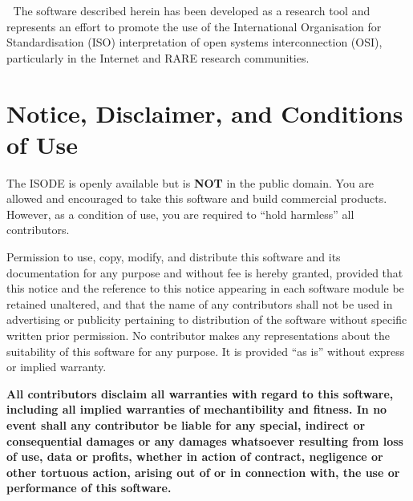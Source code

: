 
\preface
The software described herein has been developed as a research tool and
represents an effort to promote the use of the International 
Organisation for Standardisation (ISO) interpretation of open systems interconnection (OSI),
particularly in the Internet and RARE research communities.

\newpage\section*	{Notice, Disclaimer, and Conditions of Use}\label{license}
The ISODE is openly available but is {\bf NOT\/} in the public domain.
You are allowed and encouraged to take this software and build commercial
products.
However, as a condition of use, you are required to ``hold harmless'' all
contributors.

\noindent
Permission to use, copy, modify, and distribute this software and its
documentation for any purpose and without fee is hereby granted, provided
that this notice and the reference to this notice
appearing in each software module be retained unaltered, 
and that the name of any contributors shall not be used in advertising
or publicity pertaining to distribution of the software without specific
written prior permission.
No contributor makes any
representations about the suitability of this software for any purpose.
It is provided ``as is'' without express or implied warranty.

\vskip 0.15in
\noindent
\begin{small}
{\bf All contributors disclaim all warranties with regard to this
software, including all implied warranties of me\-chan\-ti\-bil\-ity
and fitness. In no event shall any contributor be liable for any
special, indirect or consequential damages or any damages whatsoever
resulting from loss of use, data or profits, whether in action of
contract, ne\-gli\-gence or other tortuous action, arising out of or
in connection with, the use or performance of this software.}
\end{small}


